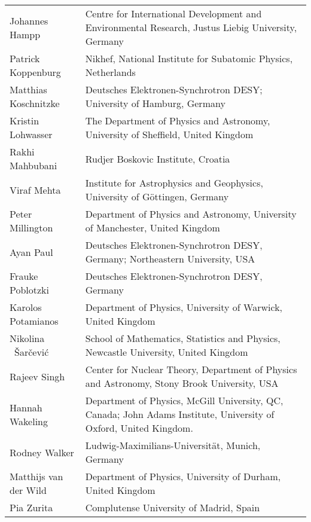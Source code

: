 \documentclass[../SustainableHEP.tex]{subfiles}
\begin{document}
\begin{longtable*}{@{}m{0.3\textwidth} p{0.7\textwidth}}
Johannes Hampp & Centre for International Development and Environmental Research, Justus Liebig University, Germany\\ %

Patrick Koppenburg & Nikhef, National Institute for Subatomic Physics, Netherlands\\ %

Matthias Koschnitzke & Deutsches Elektronen-Synchrotron DESY; University of Hamburg, Germany \\ %

Kristin Lohwasser & The Department of Physics and Astronomy, University of Sheffield, United Kingdom\\ %

Rakhi Mahbubani & Rudjer Boskovic Institute, Croatia\\

Viraf Mehta & Institute for Astrophysics and Geophysics, University of G\"ottingen, Germany\\

Peter Millington & Department of Physics and Astronomy, University of Manchester, United Kingdom\\ %

Ayan Paul & Deutsches Elektronen-Synchrotron DESY, Germany; Northeastern University, USA\\ %

Frauke Poblotzki & Deutsches Elektronen-Synchrotron DESY, Germany \\ %

Karolos Potamianos & Department of Physics, University of Warwick, United Kingdom \\ %

Nikolina ~\v{S}ar\v{c}evi\'c &
School of Mathematics, Statistics and Physics, Newcastle University, United Kingdom \\ %

Rajeev Singh & Center for Nuclear Theory, Department of Physics and Astronomy, Stony Brook University, USA\\

Hannah Wakeling & Department of Physics, McGill University, QC, Canada; John Adams Institute, University of Oxford, United Kingdom.\\ %

Rodney Walker & Ludwig-Maximilians-Universit\"at, Munich, Germany\\

Matthijs van der Wild & Department of Physics, University of Durham, United Kingdom\\ 

Pia Zurita & Complutense University of Madrid, Spain

\end{longtable*}
\renewcommand{\arraystretch}{1}
\end{document}
